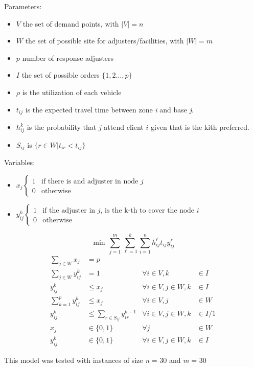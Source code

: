 \begin{frame}
  Parameters:
  \begin{itemize}
  \item $V$ the set of demand points, with $|V| = n$
  \item $W$ the set of possible site for adjusters/facilities, with $|W| = m$
  \item $p$ number of response adjusters
  \item $I$ the set of possible orders $\{1,2\ldots,p\}$
  \item $\rho$ is the utilization of each vehicle
  \item $t_{ij}$ is the expected travel time between zone \textit{i} and base \textit{j}.
  \item $h_{ij}^{k}$ is the probability that $j$ attend client $i$ given that
    is the kith preferred.
  \item $S_{ij}$ is $\{r\in W | t_{ir} < t_{ij}\}$
  \end{itemize}
  
  Variables:
  \begin{itemize}
  \item $x_j 
    \begin{cases} 
      1 & \mbox{if there is and adjuster in node } j \\
      0 & \mbox{otherwise}
    \end{cases}$
  \item $y_{ij}^k 
    \begin{cases} 
      1 & \mbox{if the adjuster in } j \mbox{, is the k-th to cover the node }i \\
      0 & \mbox{otherwise}
  \end{cases}$
  \end{itemize}
\end{frame}

\begin{frame}[allowframebreaks]{}{}

{\small
  \begin{equation}
    \min \, \sum_{j=1}^{m}{\sum_{\ell=1}^{k}{\sum_{i=1}^{n}{h_{ij}^{\ell}t_{ij}y_{ij}^{\ell}}}}
  \end{equation}
}
{\small
  \begin{align}
    \sum_{j \in W}{x_j} & = p               &                                  &\\
    \sum_{j \in W}{y_{ij}^{k}} & = 1        &         \forall i \in V, k &\in I \\
    y_{ij}^{k} & \leq x_j                   & \forall i \in V,j \in W, k &\in I \\
    \sum_{k = 1}^{p}{y_{ij}^{k}} & \leq x_j &         \forall i \in V, j &\in W \\
    y_{ij}^{k} &\leq \sum_{r\in S_{ij}}{y_{ir}^{k-1}} & \forall i \in V,j \in W, k &\in I/{1} \\
    x_{j} & \in \{0,1\}      &                 \forall j &\in W \nonumber\\
    y_{ij}^{k} & \in \{0,1\} & \forall i \in V,j \in W,k &\in I \nonumber
  \end{align}
}
\end{frame}

\begin{frame}
  This model was tested with instances of size \textit{n} = 30 and \textit{m} = 30
\end{frame}
